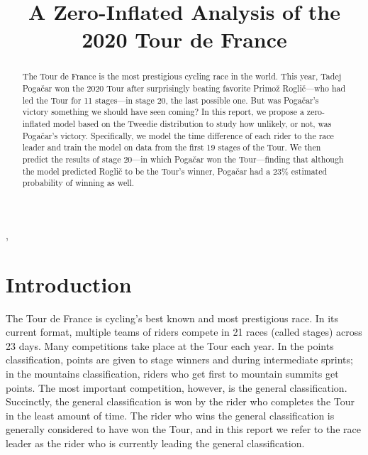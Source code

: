 \documentclass[aos,preprint]{imsart}
\begin{document}
\begin{frontmatter}
\title{A Zero-Inflated Analysis of the 2020 Tour de France}

\begin{aug}
\author{ },

\runauthor{}


\address{Department of Statistics\\
University of British Columbia\\
Vancouver, BC, Canada V6T 1Z4\\
E-mail: \normalfont
\href{mailto:gian.diluvi@stat.ubc.ca}{gian.diluvi@stat.ubc.ca}}

\end{aug}

\begin{abstract}
The Tour de France is the most prestigious cycling race in the world. This year, Tadej Pogačar won the 2020 Tour after surprisingly beating favorite Primož Roglič---who had led the Tour for 11 stages---in stage 20, the last possible one. But was Pogačar's victory something we should have seen coming? In this report, we propose a zero-inflated model based on the Tweedie distribution to study how unlikely, or not, was Pogačar's victory. Specifically, we model the time difference of each rider to the race leader and train the model on data from the first 19 stages of the Tour. We then predict the results of stage 20---in which Pogačar won the Tour---finding that although the model predicted Roglič to be the Tour's winner, Pogačar had a 23\% estimated probability of winning as well.
\end{abstract}



\end{frontmatter}

\section{Introduction} \label{sec:intro}


The Tour de France is cycling's best known and most prestigious race. In its current format, multiple teams of riders compete in 21 races (called stages) across 23 days. Many competitions take place at the Tour each year. In the points classification, points are given to stage winners and during intermediate sprints; in the mountains classification, riders who get first to mountain summits get points. The most important competition, however, is the general classification. Succinctly, the general classification is won by the rider who completes the Tour in the least amount of time. The rider who wins the general classification is generally considered to have won the Tour, and in this report we refer to the race leader as the rider who is currently leading the general classification. \\
\end{document}
